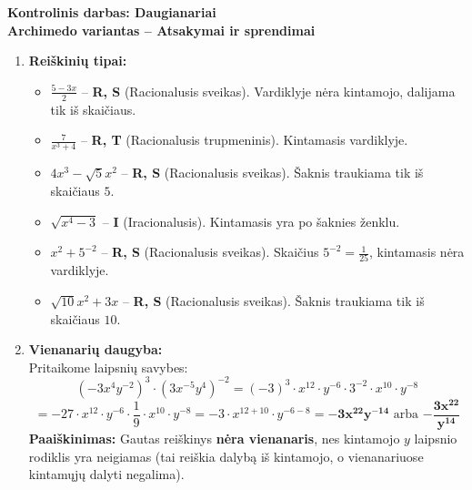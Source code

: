 \documentclass[12pt,a4paper]{article}
\begin{document}
\begin{center}
    {\Large \textbf{Kontrolinis darbas: Daugianariai}}\\[0.3cm]
    {\large \textbf{Archimedo variantas -- Atsakymai ir sprendimai}}
\end{center}
\vspace{0.5cm}

\begin{enumerate}
    \item \textbf{Reiškinių tipai:}
    \begin{itemize}
        \item[a)] $\displaystyle \frac{5-3x}{2}$ -- \textbf{R, S} (Racionalusis sveikas). Vardiklyje nėra kintamojo, dalijama tik iš skaičiaus.
        \item[b)] $\displaystyle \frac{7}{x^3 + 4}$ -- \textbf{R, T} (Racionalusis trupmeninis). Kintamasis vardiklyje.
        \item[c)] $\displaystyle 4x^3 - \sqrt{5} x^2$ -- \textbf{R, S} (Racionalusis sveikas). Šaknis traukiama tik iš skaičiaus $5$.
        \item[d)] $\displaystyle \sqrt{x^4 - 3}$ -- \textbf{I} (Iracionalusis). Kintamasis yra po šaknies ženklu.
        \item[e)] $\displaystyle x^2 + 5^{-2}$ -- \textbf{R, S} (Racionalusis sveikas). Skaičius $5^{-2} = \frac{1}{25}$, kintamasis nėra vardiklyje.
        \item[f)] $\displaystyle \sqrt{10}x^2 + 3x$ -- \textbf{R, S} (Racionalusis sveikas). Šaknis traukiama tik iš skaičiaus $10$.
    \end{itemize}

    \vspace{0.3cm}
    \item \textbf{Vienanarių daugyba:} \\
    Pritaikome laipsnių savybes:
    $$ \left( -3x^4y^{-2} \right)^3 \cdot \left( 3x^{-5}y^4 \right)^{-2} = (-3)^3 \cdot x^{12} \cdot y^{-6} \cdot 3^{-2} \cdot x^{10} \cdot y^{-8} $$
    $$ = -27 \cdot x^{12} \cdot y^{-6} \cdot \frac{1}{9} \cdot x^{10} \cdot y^{-8} = -3 \cdot x^{12+10} \cdot y^{-6-8} = \mathbf{-3x^{22}y^{-14}} \text{ arba } \mathbf{-\frac{3x^{22}}{y^{14}}} $$
    \textbf{Paaiškinimas:} Gautas reiškinys \textbf{nėra vienanaris}, nes kintamojo $y$ laipsnio rodiklis yra neigiamas (tai reiškia dalybą iš kintamojo, o vienanariuose kintamųjų dalyti negalima).


\end{enumerate}
\end{document}
